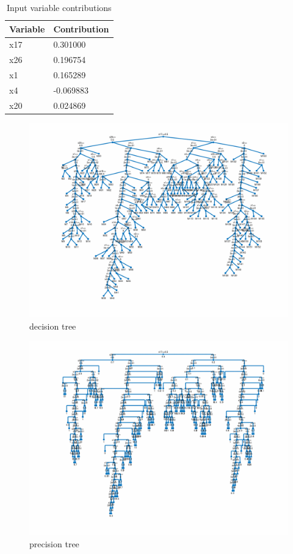 \documentclass{article}
\begin{document}
\begin{table}[H]
	\centering
	\caption{Input variable contributions}
	\label{tab:Variable-Contribution}
	\begin{tabular}{|l|l|}
		\hline
		\textbf{Variable}   & \textbf{Contribution}	\\ \hline
		x17	       			& 0.301000 				\\ \hline
		x26	       			& 0.196754 				\\ \hline
		x1	       			& 0.165289 				\\ \hline
		x4	       			& -0.069883				\\ \hline
		x20	       			& 0.024869 				\\ \hline
	\end{tabular}
\end{table}

\newpage
\begin{figure}
	\includegraphics[width=\textwidth,height=\textheight,keepaspectratio]{decision_tree.png}
	\caption{decision tree}
\end{figure}	
\begin{figure}
	\centering
	\includegraphics[width=\textwidth,height=\textheight,keepaspectratio]{precision_tree.png}
	\caption{precision tree}
\end{figure}
\clearpage
\end{document}
